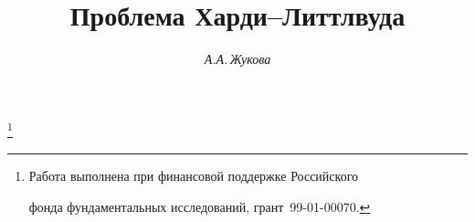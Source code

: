 









\newcommand{\myfont}{\series{m}\shape{n}\selectfont}


\newcommand{\Mod}{\operatorname{mod}}


\newcommand{\tts}[1]{}







\setcounter{page}{41}















\author{\it А.А.\,Жукова }




\title{Проблема Харди--Литтлвуда}


\thanks{Работа выполнена при финансовой поддержке Российского


фонда фундаментальных исследований, грант \No\,99-01-00070.}


\date{}







\pagestyle{plain} %







